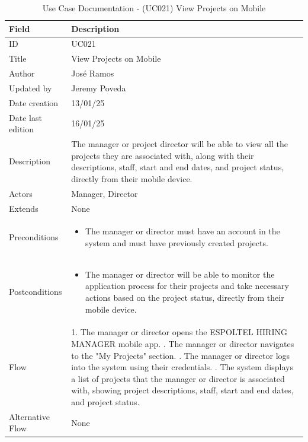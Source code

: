 \documentclass{scrreprt}
\begin{document}
\begin{table}[H]
	\centering
	\begin{tabular}{|p{3cm}|p{10cm}|}
		\hline
		\textbf{Field} & \textbf{Description} \\ \hline
		ID & UC021 \\ \hline
		Title & View Projects on Mobile \\ \hline
		Author & José Ramos \\ \hline
		Updated by & Jeremy Poveda\\ \hline
		Date creation & 13/01/25 \\ \hline
		Date last edition & 16/01/25 \\ \hline
		Description & 
		The manager or project director will be able to view all the projects they are associated with, along with their descriptions, staff, start and end dates, and project status, directly from their mobile device. \\ \hline
		Actors & Manager, Director \\ \hline
		Extends & None \\ \hline
		Preconditions & 
		\begin{itemize}
			\item The manager or director must have an account in the system and must have previously created projects.
		\end{itemize} \\ \hline
		Postconditions & 
		\begin{itemize}
			\item The manager or director will be able to monitor the application process for their projects and take necessary actions based on the project status, directly from their mobile device.
		\end{itemize} \\ \hline
		Flow & 
		1. The manager or director opens the ESPOLTEL HIRING MANAGER mobile app. \newline
		2. The manager or director navigates to the "My Projects" section. \newline
		3. The manager or director logs into the system using their credentials. \newline
		4. The system displays a list of projects that the manager or director is associated with, showing project descriptions, staff, start and end dates, and project status. \\ \hline
		Alternative Flow & 
		None \\ \hline
	\end{tabular}
	\caption{Use Case Documentation - (UC021) View Projects on Mobile}
	\label{table:UC021}
\end{table}
\end{document}
